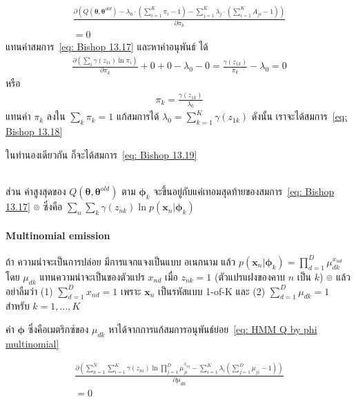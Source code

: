 \begin{eqnarray}
\frac{\partial \left( Q(\bm{\theta},\bm{\theta}^{old}) - \lambda_0 \cdot(\sum_{i=1}^K \pi_i - 1) - \sum_{j=1}^K \lambda_j \cdot(\sum_{i=1}^K A_{ji} - 1) \right)}{\partial \pi_k} 
\nonumber \\
= 0
\label{eq: HMM diff Q by pi}
\end{eqnarray}
แทนค่าสมการ~\ref{eq: Bishop 13.17} และหาค่าอนุพันธ์ ได้
\begin{eqnarray}
\frac{\partial \left( \sum_i \gamma (z_{1i}) \ln \pi_i\right)}{\partial \pi_k} + 0 + 0 - \lambda_0 - 0 
= \frac{\gamma (z_{1k})}{\pi_k} - \lambda_0 = 0
\nonumber
\end{eqnarray}
หรือ
\begin{eqnarray}
\pi_k = \frac{\gamma (z_{1k})}{\lambda_0}
\label{eq: HMM pi_k}
\end{eqnarray}
แทนค่า $\pi_k$ ลงใน $\sum_k \pi_k = 1$ 
แก้สมการได้ $\lambda_0 = \sum_{k=1}^K \gamma (z_{1k})$ ดังนั้น เราจะได้สมการ~\ref{eq: Bishop 13.18}

ในทำนองเดียวกัน ก็จะได้สมการ~\ref{eq: Bishop 13.19}

 \\

ส่วน ค่าสูงสุดของ $Q(\bm{\theta}, \bm{\theta}^{old})$ ตาม $\bm{\phi}_k$ จะขึ้นอยู่กับแค่เทอมสุดท้ายของสมการ~\ref{eq: Bishop 13.17}
๏ ซึ่งคือ $\sum_n \sum_k \gamma (z_{nk}) \ln p(\textbf{x}_n|\bm{\phi}_k) $

\paragraph{Multinomial emission} ถ้า ความน่าจะเป็นการปล่อย มีการแจกแจงเป็นแบบ	อเนกนาม แล้ว $p(\textbf{x}_n|\bm{\phi}_k) = \prod_{d=1}^D \mu_{dk}^{x_{nd}}$ โดย $\mu_{dk}$ แทนความน่าจะเป็นของตัวแปร $x_{nd}$ เมื่อ $z_{nk} = 1$ (ตัวแปรแฝงของคาบ $n$ เป็น $k$)
๏ แล้ว อย่าลืมว่า (1) $\sum_{d=1}^D x_{nd} = 1$ เพราะ $\textbf{x}_n$ เป็นรหัสแบบ 1-of-K
และ (2) $\sum_{d=1}^D \mu_{dk} = 1$ สำหรับ $k=1, \ldots, K$

ค่า $\bm{\phi}$ ซึ่งคือเมตริกซ์ของ $\mu_{dk}$ หาได้จากการแก้สมการอนุพันธ์ย่อย~\ref{eq: HMM Q by phi multinomial}

\begin{eqnarray}
\frac{\partial \left( \sum_{n=1}^N \sum_{i=1}^K \gamma (z_{ni}) \ln \prod_{j=1}^D \mu_{ji}^{x_{nj}} - \sum_{i=1}^K \lambda_i (\sum_{j=1}^D \mu_{ji} - 1)\right)} {\partial \mu_{dk}} 
\nonumber \\
= 0
\label{eq: HMM Q by phi multinomial} 
\end{eqnarray}

